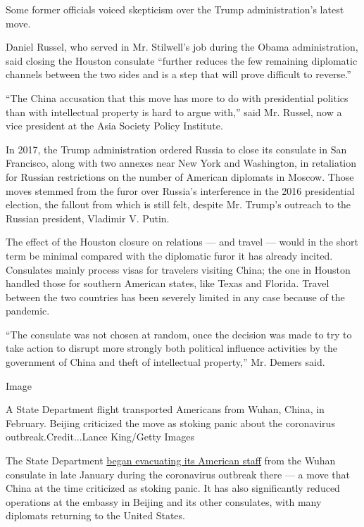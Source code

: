 Some former officials voiced skepticism over the Trump administration's
latest move.

Daniel Russel, who served in Mr. Stilwell's job during the Obama
administration, said closing the Houston consulate ``further reduces the
few remaining diplomatic channels between the two sides and is a step
that will prove difficult to reverse.''

``The China accusation that this move has more to do with presidential
politics than with intellectual property is hard to argue with,'' said
Mr. Russel, now a vice president at the Asia Society Policy Institute.

In 2017, the Trump administration ordered Russia to close its consulate
in San Francisco, along with two annexes near New York and Washington,
in retaliation for Russian restrictions on the number of American
diplomats in Moscow. Those moves stemmed from the furor over Russia's
interference in the 2016 presidential election, the fallout from which
is still felt, despite Mr. Trump's outreach to the Russian president,
Vladimir V. Putin.

The effect of the Houston closure on relations --- and travel --- would
in the short term be minimal compared with the diplomatic furor it has
already incited. Consulates mainly process visas for travelers visiting
China; the one in Houston handled those for southern American states,
like Texas and Florida. Travel between the two countries has been
severely limited in any case because of the pandemic.

``The consulate was not chosen at random, once the decision was made to
try to take action to disrupt more strongly both political influence
activities by the government of China and theft of intellectual
property,'' Mr. Demers said.

Image

A State Department flight transported Americans from Wuhan, China, in
February. Beijing criticized the move as stoking panic about the
coronavirus outbreak.Credit...Lance King/Getty Images

The State Department
\href{https://www.nytimes3xbfgragh.onion/2020/02/05/us/coronavirus-flights-wuhan.html}{began
evacuating its American staff} from the Wuhan consulate in late January
during the coronavirus outbreak there --- a move that China at the time
criticized as stoking panic. It has also significantly reduced
operations at the embassy in Beijing and its other consulates, with many
diplomats returning to the United States.


